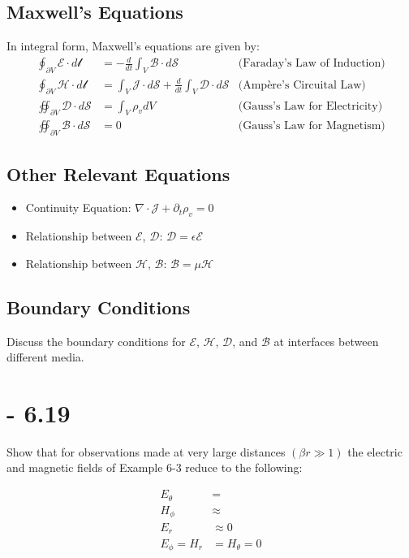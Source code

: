 \documentclass[12pt]{article}
\begin{document}
\subsection*{Maxwell's Equations}
In integral form, Maxwell's equations are given by:
\begin{align}
  \oint_{\partial V} \bm{\mathcal{E}} \cdot d\bm{\mathcal{l}} &= - \frac{d}{dt} \int_{V} \bm{\mathcal{B}} \cdot d\bm{\mathcal{S}} & \text{(Faraday's Law of Induction)} \\
  \oint_{\partial V} \bm{\mathcal{H}} \cdot d\bm{\mathcal{l}} &= \int_{V} \bm{\mathcal{J}} \cdot d\bm{\mathcal{S}} + \frac{d}{dt} \int_{V} \bm{\mathcal{D}} \cdot d\bm{\mathcal{S}} & \text{(Ampère's Circuital Law)} \\
  \oiint_{\partial V} \bm{\mathcal{D}} \cdot d\bm{\mathcal{S}} &= \int_{V} \rho_v dV & \text{(Gauss's Law for Electricity)} \\
  \oiint_{\partial V} \bm{\mathcal{B}} \cdot d\bm{\mathcal{S}} &= 0 & \text{(Gauss's Law for Magnetism)}
\end{align}

\subsection*{Other Relevant Equations}
\begin{itemize}
  \item Continuity Equation: $\nabla \cdot \bm{\mathcal{J}} + \partial_t \rho_v = 0$
  \item Relationship between $\bm{\mathcal{E}}$, $\bm{\mathcal{D}}$: $\bm{\mathcal{D}} = \epsilon \bm{\mathcal{E}}$
  \item Relationship between $\bm{\mathcal{H}}$, $\bm{\mathcal{B}}$: $\bm{\mathcal{B}} = \mu \bm{\mathcal{H}}$
\end{itemize}

\subsection*{Boundary Conditions}
Discuss the boundary conditions for $\bm{\mathcal{E}}$, $\bm{\mathcal{H}}$, $\bm{\mathcal{D}}$, and $\bm{\mathcal{B}}$ at interfaces between different media.
\newpage
\section{- 6.19}
Show that for observations made at very large distances $(\beta r \gg 1)$ the electric and magnetic fields of Example 6-3 reduce to the following:
\begin{center}
  \begin{align*}
    E_{\theta} &= \\
    H_{\phi} &\approx \\
    E_{r} &\approx 0\\
    E_{\phi} = H_r &= H_{\theta} = 0
  \end{align*}
\end{center}
\end{document}
